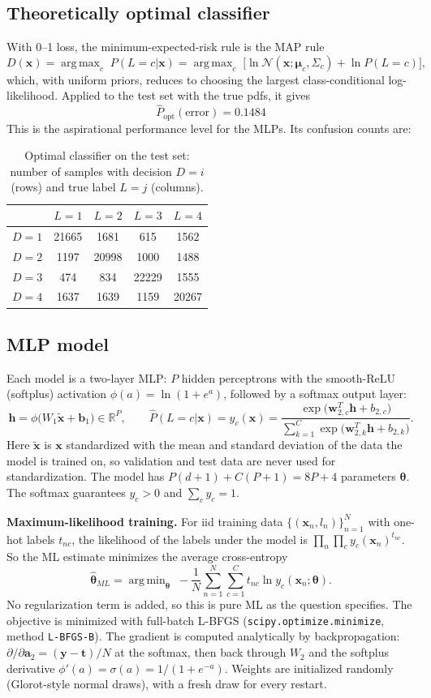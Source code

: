 \documentclass[11pt]{article}
\newcommand{\x}{{\mathbf{x}}}
\DeclareMathOperator*{\argmin}{arg\,min}\DeclareMathOperator*{\argmax}{arg\,max}
\begin{document}
\subsection*{Theoretically optimal classifier}
With 0--1 loss, the minimum-expected-risk rule is the MAP rule
\[
D(\x)=\argmax_{c}\;P(L=c|\x)=\argmax_c\;\Big[\ln\mathcal N(\x;\bm\mu_c,\Sigma_c)+\ln P(L=c)\Big],
\]
which, with uniform priors, reduces to choosing the largest class-conditional log-likelihood. Applied to the test set with the true pdfs, it gives
\[
\boxed{\hat P_{\text{opt}}(\text{error})=0.1484}
\]
This is the aspirational performance level for the MLPs. Its confusion counts are:
\begin{table}[H]\centering
\begin{tabular}{lcccc}\toprule
 & $L=1$ & $L=2$ & $L=3$ & $L=4$\\\midrule
$D=1$ & 21665 & 1681 & 615 & 1562\\
$D=2$ & 1197 & 20998 & 1000 & 1488\\
$D=3$ & 474 & 834 & 22229 & 1555\\
$D=4$ & 1637 & 1639 & 1159 & 20267\\
\bottomrule\end{tabular}
\caption{Optimal classifier on the test set: number of samples with decision $D=i$ (rows) and true label $L=j$ (columns).}
\end{table}

\subsection*{MLP model}
Each model is a two-layer MLP: $P$ hidden perceptrons with the smooth-ReLU (softplus) activation $\phi(a)=\ln(1+e^{a})$, followed by a softmax output layer:
\[
\mathbf h=\phi\big(W_1\tilde\x+\mathbf b_1\big)\in\mathbb R^P,\qquad
\hat P(L=c|\x)=y_c(\x)=\frac{\exp\big(\mathbf w_{2,c}^T\mathbf h+b_{2,c}\big)}{\sum_{k=1}^C\exp\big(\mathbf w_{2,k}^T\mathbf h+b_{2,k}\big)} .
\]
Here $\tilde\x$ is $\x$ standardized with the mean and standard deviation of the data the model is trained on, so validation and test data are never used for standardization. The model has $P(d+1)+C(P+1)=8P+4$ parameters $\bm\theta$. The softmax guarantees $y_c>0$ and $\sum_cy_c=1$.

\textbf{Maximum-likelihood training.} For iid training data $\{(\x_n,l_n)\}_{n=1}^N$ with one-hot labels $t_{nc}$, the likelihood of the labels under the model is $\prod_n\prod_c y_c(\x_n)^{t_{nc}}$. So the ML estimate minimizes the average cross-entropy
\[
\hat{\bm\theta}_{ML}=\argmin_{\bm\theta}\;-\frac1N\sum_{n=1}^N\sum_{c=1}^C t_{nc}\ln y_c(\x_n;\bm\theta).
\]
No regularization term is added, so this is pure ML as the question specifies. The objective is minimized with full-batch L-BFGS (\texttt{scipy.optimize.minimize}, method \texttt{L-BFGS-B}). The gradient is computed analytically by backpropagation: $\partial/\partial\mathbf a_2=(\mathbf y-\mathbf t)/N$ at the softmax, then back through $W_2$ and the softplus derivative $\phi'(a)=\sigma(a)=1/(1+e^{-a})$. Weights are initialized randomly (Glorot-style normal draws), with a fresh draw for every restart.
\end{document}
